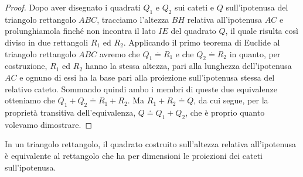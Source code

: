 \noindent\begin{minipage}{0.55\textwidth}\parindent15pt
\begin{proof}
Dopo aver disegnato i quadrati $Q_1$ e $Q_2$ sui cateti e $Q$ 
sull'ipotenusa del triangolo rettangolo $ABC$, tracciamo l'altezza 
$BH$ relativa all'ipotenusa $AC$ e prolunghiamola finché non incontra 
il lato $IE$ del quadrato $Q$, il quale risulta così diviso in due 
rettangoli $R_1$ ed $R_2$.
Applicando il primo teorema di Euclide al triangolo rettangolo $ABC$ 
avremo che $Q_1\doteq R_1$ e che $Q_2\doteq R_2$ in quanto, per 
costruzione, $R_1$ ed $R_2$ hanno la stessa altezza, pari alla 
lunghezza dell'ipotenusa $AC$ e ognuno di essi ha la base pari alla 
proiezione sull'ipotenusa stessa del relativo cateto. Sommando quindi 
ambo i membri di queste due equivalenze otteniamo che $Q_1+Q_2\doteq 
R_1+R_2$. Ma $R_1+R_2\doteq Q$, da cui segue, per la proprietà 
transitiva dell'equivalenza, $Q\doteq Q_1+Q_2$, che è proprio quanto 
volevamo dimostrare.
\end{proof}
\end{minipage}\hfil
\begin{minipage}{0.45\textwidth}
  \centering
\end{minipage}\vspace{8pt}


\begin{teorema}
In un triangolo rettangolo, il quadrato costruito sull'altezza 
relativa all'ipotenusa è equivalente al rettangolo che ha per 
dimensioni le proiezioni dei cateti sull'ipotenusa.
\end{teorema}

